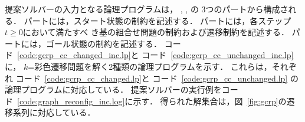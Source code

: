 提案ソルバーの入力となる論理プログラムは，
, , 
の 3つのパートから構成される．
 パートには，スタート状態の制約を記述する．
 パートには，各ステップ$t\geq 0$において満たすべ
き基の組合せ問題の制約および遷移制約を記述する．
 パートには，ゴール状態の制約を記述する．
%
コード~\ref{code:gcrp_cc_changed_inc.lp}と
コード~\ref{code:gcrp_cc_unchanged_inc.lp}に，
$k$=彩色遷移問題を解く2種類の論理プログラムを示す．
これらは，それぞれ
コード~\ref{code:gcrp_cc_changed.lp}と
コード~\ref{code:gcrp_cc_unchanged.lp}
の論理プログラムに対応している．
提案ソルバーの実行例をコード~\ref{code:graph_reconfig_inc.log}に示す．
得られた解集合は，図~\ref{fig:gcrp}の遷移系列に対応している．

